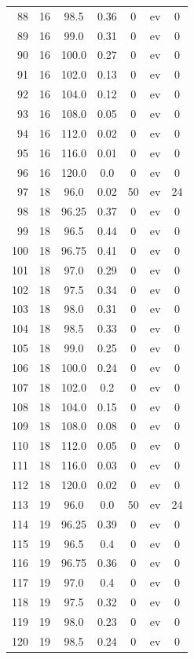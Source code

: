 \documentclass[12pt,a4paper]{article}
\begin{document}
\begin{tabular}{r|cccccc}
	88 & 16 & 98.5 & 0.36 & 0 & ev & 0 \\
	89 & 16 & 99.0 & 0.31 & 0 & ev & 0 \\
	90 & 16 & 100.0 & 0.27 & 0 & ev & 0 \\
	91 & 16 & 102.0 & 0.13 & 0 & ev & 0 \\
	92 & 16 & 104.0 & 0.12 & 0 & ev & 0 \\
	93 & 16 & 108.0 & 0.05 & 0 & ev & 0 \\
	94 & 16 & 112.0 & 0.02 & 0 & ev & 0 \\
	95 & 16 & 116.0 & 0.01 & 0 & ev & 0 \\
	96 & 16 & 120.0 & 0.0 & 0 & ev & 0 \\
	97 & 18 & 96.0 & 0.02 & 50 & ev & 24 \\
	98 & 18 & 96.25 & 0.37 & 0 & ev & 0 \\
	99 & 18 & 96.5 & 0.44 & 0 & ev & 0 \\
	100 & 18 & 96.75 & 0.41 & 0 & ev & 0 \\
	101 & 18 & 97.0 & 0.29 & 0 & ev & 0 \\
	102 & 18 & 97.5 & 0.34 & 0 & ev & 0 \\
	103 & 18 & 98.0 & 0.31 & 0 & ev & 0 \\
	104 & 18 & 98.5 & 0.33 & 0 & ev & 0 \\
	105 & 18 & 99.0 & 0.25 & 0 & ev & 0 \\
	106 & 18 & 100.0 & 0.24 & 0 & ev & 0 \\
	107 & 18 & 102.0 & 0.2 & 0 & ev & 0 \\
	108 & 18 & 104.0 & 0.15 & 0 & ev & 0 \\
	109 & 18 & 108.0 & 0.08 & 0 & ev & 0 \\
	110 & 18 & 112.0 & 0.05 & 0 & ev & 0 \\
	111 & 18 & 116.0 & 0.03 & 0 & ev & 0 \\
	112 & 18 & 120.0 & 0.02 & 0 & ev & 0 \\
	113 & 19 & 96.0 & 0.0 & 50 & ev & 24 \\
	114 & 19 & 96.25 & 0.39 & 0 & ev & 0 \\
	115 & 19 & 96.5 & 0.4 & 0 & ev & 0 \\
	116 & 19 & 96.75 & 0.36 & 0 & ev & 0 \\
	117 & 19 & 97.0 & 0.4 & 0 & ev & 0 \\
	118 & 19 & 97.5 & 0.32 & 0 & ev & 0 \\
	119 & 19 & 98.0 & 0.23 & 0 & ev & 0 \\
	120 & 19 & 98.5 & 0.24 & 0 & ev & 0 \\

\end{tabular}
\end{document}
